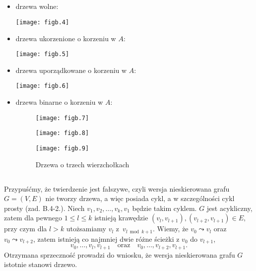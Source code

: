 \subsection{} %
\begin{itemize}
	\item drzewa wolne:
	\begin{center}
		\texttt{[image: figb.4]}
	\end{center}
	\item drzewa ukorzenione o korzeniu w $A$:
	\begin{center}
		\texttt{[image: figb.5]}
	\end{center}
	\item drzewa uporządkowane o korzeniu w $A$:
	\begin{center}
		\texttt{[image: figb.6]}
	\end{center}
	\item drzewa binarne o korzeniu w $A$:
	\begin{figure}[h]
		\begin{center}
			\texttt{[image: figb.7]} \\
		\end{center}
		\begin{center}
			\texttt{[image: figb.8]} \\
		\end{center}
		\begin{center}
			\texttt{[image: figb.9]}
		\end{center}
		\caption{Drzewa o trzech wierzchołkach}
	\end{figure}
\end{itemize}

\subsection{} %
Przypuśćmy, że twierdzenie jest fałszywe, czyli wersja nieskierowana grafu $G=(V,E)$ nie tworzy drzewa, a więc posiada cykl, a w szczególności cykl prosty (zad. B.4-2.). Niech $v_1,v_2,\dots,v_k,v_1$ będzie takim cyklem. $G$ jest acykliczny, zatem dla pewnego $1\le l\le k$ istnieją krawędzie $(v_l,v_{l+1}),(v_{l+2},v_{l+1})\in E$, przy czym dla $l>k$ utożsamiamy $v_l$ z~$v_{l\bmod k+1}$. Wiemy, że $v_0\leadsto v_l$ oraz $v_0\leadsto v_{l+2}$, zatem istnieją co najmniej dwie różne ścieżki z $v_0$ do $v_{l+1}$,
\[
	v_0,\dots,v_l,v_{l+1}\quad\mbox{oraz}\quad v_0,\dots,v_{l+2},v_{l+1}.
\]
Otrzymana sprzeczność prowadzi do wniosku, że wersja nieskierowana grafu $G$ istotnie stanowi drzewo.

